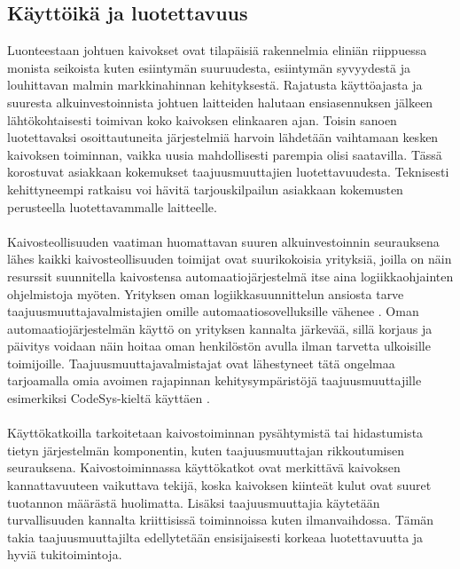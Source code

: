 \documentclass[finnish,12pt,a4paper,pdftex,elec,utf8]{aaltothesis}
\begin{document}

\subsection{Käyttöikä ja luotettavuus}
Luonteestaan johtuen kaivokset ovat tilapäisiä rakennelmia eliniän riippuessa monista seikoista kuten esiintymän suuruudesta, esiintymän syvyydestä ja louhittavan malmin markkinahinnan kehityksestä. Rajatusta käyttöajasta ja suuresta alkuinvestoinnista johtuen laitteiden halutaan ensiasennuksen jälkeen lähtökohtaisesti toimivan koko kaivoksen elinkaaren ajan. Toisin sanoen luotettavaksi osoittautuneita järjestelmiä harvoin lähdetään vaihtamaan kesken kaivoksen toiminnan, vaikka uusia mahdollisesti parempia olisi saatavilla. Tässä korostuvat asiakkaan kokemukset taajuusmuuttajien luotettavuudesta. Teknisesti kehittyneempi ratkaisu voi hävitä tarjouskilpailun asiakkaan kokemusten perusteella luotettavammalle laitteelle. \cite{MyyntiHaastattelu}
\\\\
Kaivosteollisuuden vaatiman huomattavan suuren alkuinvestoinnin seurauksena lähes kaikki kaivosteollisuuden toimijat ovat suurikokoisia yrityksiä, joilla on näin resurssit suunnitella kaivostensa automaatiojärjestelmä itse aina logiikkaohjainten ohjelmistoja myöten. Yrityksen oman logiikkasuunnittelun ansiosta tarve taajuusmuuttajavalmistajien omille automaatiosovelluksille vähenee \cite{MyyntiHaastattelu}. Oman automaatiojärjestelmän käyttö on yrityksen kannalta järkevää, sillä korjaus ja päivitys voidaan näin hoitaa oman henkilöstön avulla ilman tarvetta ulkoisille toimijoille. \cite{MyyntiHaastattelu} Taajuusmuuttajavalmistajat ovat lähestyneet tätä ongelmaa tarjoamalla omia avoimen rajapinnan kehitysympäristöjä taajuusmuuttajille esimerkiksi CodeSys-kieltä käyttäen \cite{880hwman}.
\\\\
Käyttökatkoilla tarkoitetaan kaivostoiminnan pysähtymistä tai hidastumista tietyn järjestelmän komponentin, kuten taajuusmuuttajan rikkoutumisen seurauksena. Kaivostoiminnassa käyttökatkot ovat merkittävä kaivoksen kannattavuuteen vaikuttava tekijä, koska kaivoksen kiinteät kulut ovat suuret tuotannon määrästä huolimatta. Lisäksi taajuusmuuttajia käytetään turvallisuuden kannalta kriittisissä toiminnoissa kuten ilmanvaihdossa. Tämän takia taajuusmuuttajilta edellytetään ensisijaisesti korkeaa luotettavuutta ja hyviä tukitoimintoja. \cite{MyyntiHaastattelu}
\end{document}
